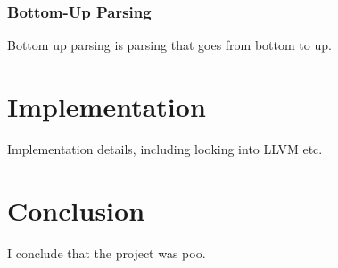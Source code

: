 \documentclass[12pt]{report}
\begin{document}
\subsection{Bottom-Up Parsing}\label{subsec:bottom_up_parsing}
Bottom up parsing is parsing that goes from bottom to up.

\chapter{Implementation}
Implementation details, including looking into LLVM etc.

\chapter{Conclusion}
I conclude that the project was poo.



\end{document}
